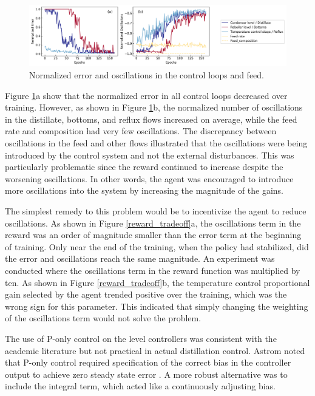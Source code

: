 \begin{figure}[t]
  \includegraphics[width=1.2\textwidth]{gfx/Chapter05/dis3_74_errors_oscillations}
  \caption{Normalized error and oscillations in the control loops and feed.}
  \label{errors_oscillations}
\end{figure}

Figure \ref{errors_oscillations}a show that the normalized error in all control loops decreased over training. However, as shown in Figure \ref{errors_oscillations}b, the normalized number of oscillations in the distillate, bottoms, and reflux flows increased on average, while the feed rate and composition had very few oscillations. The discrepancy between oscillations in the feed and other flows illustrated that the oscillations were being introduced by the control system and not the external disturbances. This was particularly problematic since the reward continued to increase despite the worsening oscillations. In other words, the agent was encouraged to introduce more oscillations into the system by increasing the magnitude of the gains.

The simplest remedy to this problem would be to incentivize the agent to reduce oscillations. As shown in Figure \ref{reward_tradeoff}a, the oscillations term in the reward was an order of magnitude smaller than the error term at the beginning of training. Only near the end of the training, when the policy had stabilized, did the error and oscillations reach the same magnitude. An experiment was conducted where the oscillations term in the reward function was multiplied by ten. As shown in Figure \ref{reward_tradeoff}b, the temperature control proportional gain selected by the agent trended positive over the training, which was the wrong sign for this parameter. This indicated that simply changing the weighting of the oscillations term would not solve the problem.

The use of P-only control on the level controllers was consistent with the academic literature\cite{Skogestad1988} but not practical in actual distillation control. Astrom noted that P-only control required specification of the correct bias in the controller output to achieve zero steady state error \cite{Astrom2006}. A more robust alternative was to include the integral term, which acted like a continuously adjusting bias.

